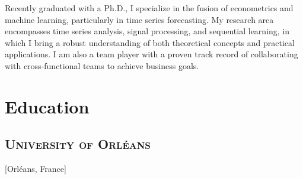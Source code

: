 \documentclass{mycv}
\begin{document}
\maketitle




\begin{summary}
  Recently graduated with a Ph.D., I specialize in the fusion of econometrics and machine learning, particularly in time series forecasting. My research area encompasses time series analysis, signal processing, and sequential learning, in which I bring a robust understanding of both theoretical concepts and practical applications. I am also a team player with a proven track record of collaborating with cross-functional teams to achieve business goals.
\end{summary}

\vspace{-1em}

\section{Education}

\subsection{\large \scshape University of Orl\'eans}[Orl\'eans, France]

\begin{positions}
\end{positions}
\end{document}
